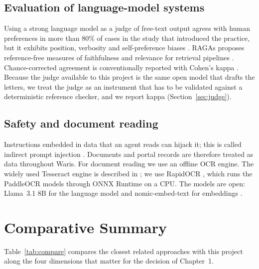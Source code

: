\documentclass[12pt,a4paper,oneside]{report}
\begin{document}
\subsection{Evaluation of language-model systems}
Using a strong language model as a judge of free-text output agrees with human preferences in more than 80\% of cases in the study that introduced the practice, but it exhibits position, verbosity and self-preference biases \cite{zheng2023judge}. RAGAs proposes reference-free measures of faithfulness and relevance for retrieval pipelines \cite{es2024ragas}. Chance-corrected agreement is conventionally reported with Cohen's kappa \cite{cohen1960kappa}. Because the judge available to this project is the same open model that drafts the letters, we treat the judge as an instrument that has to be validated against a deterministic reference checker, and we report kappa (Section~\ref{sec:judge}).

\subsection{Safety and document reading}
Instructions embedded in data that an agent reads can hijack it; this is called indirect prompt injection \cite{greshake2023}. Documents and portal records are therefore treated as data throughout Waris. For document reading we use an offline OCR engine. The widely used Tesseract engine is described in \cite{smith2007tess}; we use RapidOCR \cite{rapidocr}, which runs the PaddleOCR models through ONNX Runtime on a CPU. The models are open: Llama~3.1 8B for the language model \cite{llama3} and nomic-embed-text for embeddings \cite{nomic2024}.

\section{Comparative Summary}
Table~\ref{tab:compare} compares the closest related approaches with this project along the four dimensions that matter for the decision of Chapter~1.
\end{document}
